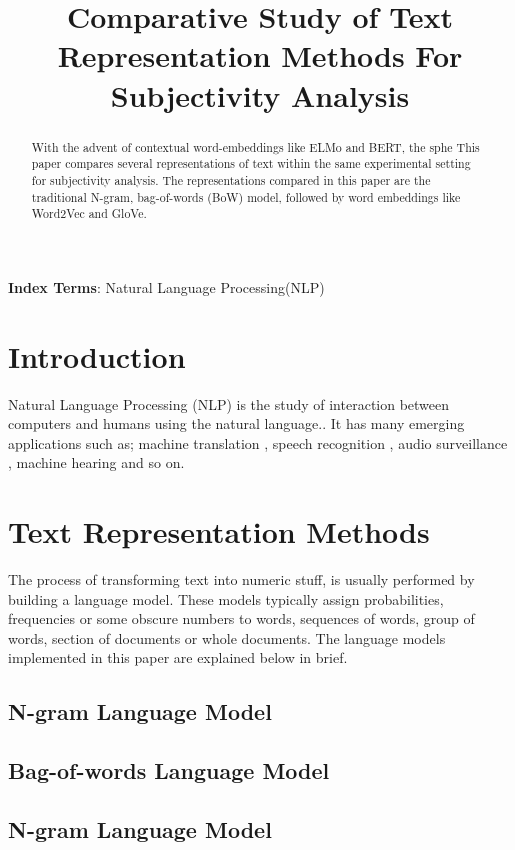 \documentclass[a4paper]{article}
\title{Comparative Study of Text Representation 
	Methods For Subjectivity Analysis}
\begin{document}
\maketitle
% 
\begin{abstract}
  With the advent of contextual word-embeddings like ELMo and BERT, the sphe
  This paper compares several representations of text within the same experimental setting for subjectivity analysis. The representations compared in this paper are the traditional N-gram, bag-of-words (BoW) model, followed by word embeddings like Word2Vec and GloVe. 
  
   
\end{abstract}
\noindent\textbf{Index Terms}: Natural Language Processing(NLP)

\section{Introduction}
\label{sec:intro}

Natural Language Processing (NLP) is the study of interaction between computers and humans using the natural language.. It has many emerging applications such as; machine translation \cite{stork2012audio}, speech recognition \cite{goetze2012acoustic}, audio surveillance \cite{foggia2015reliable} \cite{mulimani2019extraction}, machine hearing \cite{lyon2010machine} and so on.


\section{Text Representation Methods}
\label{sec:format}
 The process of transforming text into numeric stuff, is usually performed by building a language model. These models typically assign probabilities, frequencies or some obscure numbers to words, sequences of words, group of words, section of documents or whole documents. The language models implemented in this paper are explained below in brief.

\subsection{N-gram Language Model}

\subsection{Bag-of-words Language Model}
\subsection{N-gram Language Model}
\end{document}
